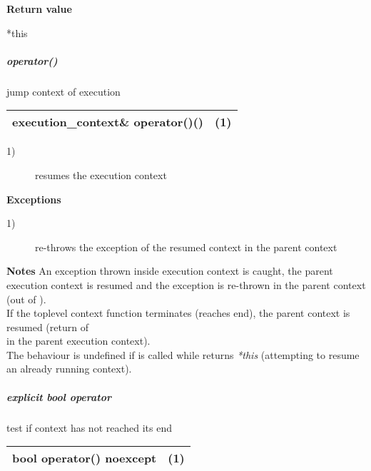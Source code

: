 {\bfseries Return value}
\begin{description}
    \item[*this]
\end{description}

\subparagraph*{operator()}
jump context of execution\\

\begin{tabular}{ l l }
    \midrule

    {\ttfamily\small\color{black}execution\_context\& {\color{blue}operator}()()} & (1)\\

    \midrule
\end{tabular}

\begin{description}
    \item[1)] resumes the execution context\\
\end{description}

{\bfseries Exceptions}
\begin{description}
    \item[1)] re-throws the exception of the resumed context in the parent context\\
\end{description}

{\bfseries Notes}
\newline
An exception thrown inside execution context is caught, the parent execution
context is resumed and the exception is re-thrown in the parent context (out of
\ectxop).\\
If the toplevel context function terminates (reaches end), the parent context is
resumed (return of\\
\ectxop in the parent execution context).\\
The behaviour is undefined if  is called while 
returns \emph{*this} (attempting to resume an already running context).

\subparagraph*{explicit bool operator}
test if context has not reached its end\\

\begin{tabular}{ l l }
    \midrule

    {\ttfamily\small\color{black}{\color{blue}explicit} {\color{blue}bool} {\color{blue}operator}() {\color{blue}noexcept}} & (1)\\

    \midrule
\end{tabular}

